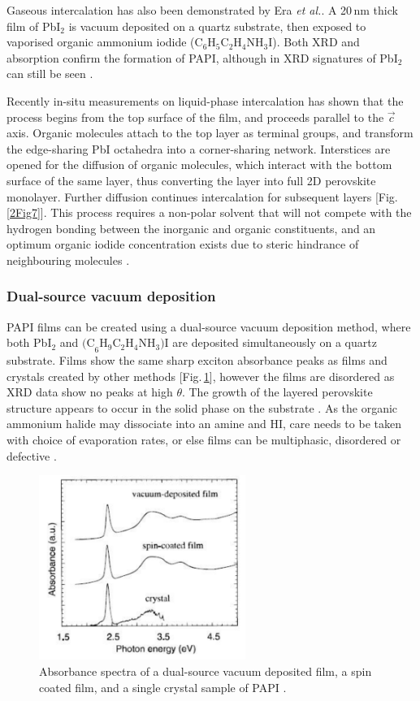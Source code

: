 Gaseous intercalation has also been demonstrated by Era \textit{et al.}. A 20\,nm thick film of Pb$\textrm{I}_2$ is vacuum deposited on a quartz substrate, then exposed to vaporised organic ammonium iodide ($\textrm{C}_6\textrm{H}_5\textrm{C}_2\textrm{H}_4\textrm{NH}_3\textrm{I}$). Both XRD and absorption confirm the formation of PAPI, although in XRD signatures of Pb$\textrm{I}_2$ can still be seen \cite{Era1998}.

Recently in-situ measurements on liquid-phase intercalation has shown that the process begins from the top surface of the  film, and proceeds parallel to the $\vec{c}$ axis. Organic molecules attach to the top  layer as terminal groups, and transform the edge-sharing PbI octahedra into a corner-sharing network. Interstices are opened for the diffusion of organic molecules, which interact with the bottom surface of the same layer, thus converting the  layer into full 2D perovskite monolayer. Further diffusion continues intercalation for subsequent layers [Fig.\,\ref{2Fig7}]. This process requires a non-polar solvent that will not compete with the hydrogen bonding between the inorganic and organic constituents, and an optimum organic iodide concentration exists due to steric hindrance of neighbouring molecules \cite{Ahmad2014}.

\subsubsection{Dual-source vacuum deposition}
PAPI films can be created using a dual-source vacuum deposition method, where both Pb$\textrm{I}_2$ and $\textrm{(C}_6\textrm{H}_9\textrm{C}_2\textrm{H}_4\textrm{NH}_3)\textrm{I}$ are deposited simultaneously on a quartz substrate. Films show the same sharp exciton absorbance peaks as films and crystals created by other methods [Fig.\,\ref{2Fig8}], however the films are disordered as XRD data show no peaks at high $\theta$. The growth of the layered perovskite structure appears to occur in the solid phase on the substrate \cite{Era1997}. As the organic ammonium halide may dissociate into an amine and HI, care needs to be taken with choice of evaporation rates, or else films can be multiphasic, disordered or defective \cite{Mitzi1999}.
\begin{figure}[h!]
\centering
\includegraphics[width=0.6\textwidth]{Fig8}
\caption{Absorbance spectra of a dual-source vacuum deposited film, a spin coated film, and a single crystal sample of PAPI \cite{Era1997}.}
\label{2Fig8}
\end{figure}

